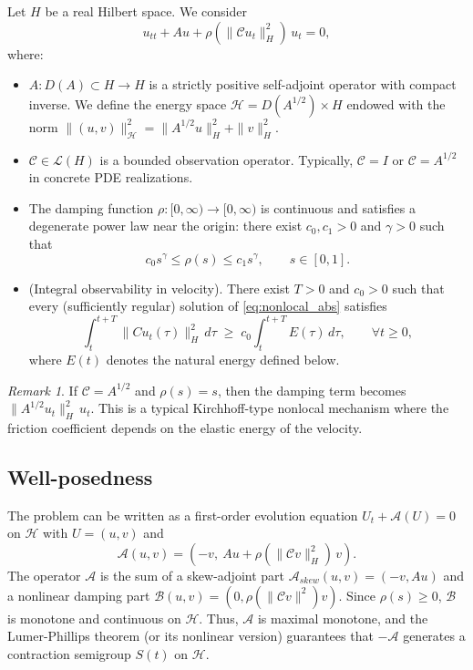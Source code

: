 \documentclass[11pt,reqno]{amsart}
\theoremstyle{remark}
\newtheorem{remark}[theorem]{Remark}
\begin{document}
Let $H$ be a real Hilbert space. We consider
\begin{equation}\label{eq:nonlocal_abs}
u_{tt}+Au+\rho(\|\mathcal C u_t\|_H^2)\,u_t=0,
\end{equation}
where:
\begin{itemize}
\item[(H1)] $A:D(A)\subset H\to H$ is a strictly positive self-adjoint operator with compact inverse.
We define the energy space $\mathcal H=D(A^{1/2})\times H$ endowed with the norm
$\|(u,v)\|_{\mathcal H}^2=\|A^{1/2}u\|_H^2+\|v\|_H^2$.

\item[(H2)] $\mathcal C\in\mathcal L(H)$ is a bounded observation operator. Typically, $\mathcal C=I$ or $\mathcal C=A^{1/2}$ in concrete PDE realizations.

\item[(H3)] The damping function $\rho:[0,\infty)\to[0,\infty)$ is continuous and satisfies
a degenerate power law near the origin: there exist $c_0, c_1 > 0$ and $\gamma > 0$ such that
\begin{equation}\label{eq:rho_deg_nonlocal}
c_0 s^\gamma \le \rho(s)\le c_1 s^\gamma,
\qquad s\in[0,1].
\end{equation}

\item[(H4)] (Integral observability in velocity). There exist $T>0$ and $c_0>0$
such that every (sufficiently regular) solution of \eqref{eq:nonlocal_abs} satisfies
\[
\int_t^{t+T} \|C u_t(\tau)\|_H^2\, d\tau
\;\ge\;
c_0 \int_t^{t+T} E(\tau)\, d\tau,
\qquad \forall t\ge 0,
\]
where $E(t)$ denotes the natural energy defined below.
\end{itemize}

\begin{remark}
If $\mathcal C=A^{1/2}$ and $\rho(s)=s$, then the damping term becomes
$\|A^{1/2}u_t\|_H^2\,u_t$. This is a typical Kirchhoff-type nonlocal mechanism where the friction coefficient depends on the elastic energy of the velocity.
\end{remark}

\subsection{Well-posedness}

The problem can be written as a first-order evolution equation $U_t+\mathcal A(U)=0$ on $\mathcal H$ with $U=(u,v)$ and
\[
\mathcal A(u,v)=(-v,\ Au+\rho(\|\mathcal C v\|_H^2)\,v).
\]
The operator $\mathcal{A}$ is the sum of a skew-adjoint part $\mathcal{A}_{skew}(u,v)=(-v, Au)$ and a nonlinear damping part $\mathcal{B}(u,v)=(0, \rho(\|\mathcal C v\|^2)v)$. Since $\rho(s) \ge 0$, $\mathcal{B}$ is monotone and continuous on $\mathcal{H}$. Thus, $\mathcal{A}$ is maximal monotone, and the Lumer-Phillips theorem (or its nonlinear version) guarantees that $-\mathcal{A}$ generates a contraction semigroup $S(t)$ on $\mathcal{H}$.
\end{document}
